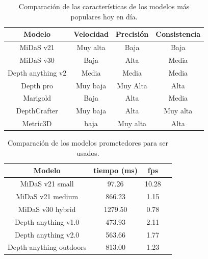 \begin{table}[h]
    \centering
    \begin{tabular}{|c|c|c|c|}
        \hline
        \textbf{Modelo} & \textbf{Velocidad}    & \textbf{Precisión}    & \textbf{Consistencia}   \\
        \hline
        MiDaS v21           & Muy alta          & Baja                  & Baja                      \\
        MiDaS v30           & Baja              & Alta                  & Media                     \\
        Depth anything v2   & Media             & Media                 & Media                     \\
        Depth pro           & Muy baja          & Muy Alta              & Alta                      \\
        Marigold            & Baja              & Alta                  & Media                      \\
        DepthCrafter        & Muy baja          & Alta                  & Muy alta                  \\
        Metric3D            & baja              & Muy alta              & Alta                      \\
        \hline
    \end{tabular}
    \caption{Comparación de las características de los modelos más populares hoy en día.}
    \label{tab:mercado_estudio}
\end{table}


\begin{table}[h]
    \centering
    \begin{tabular}{|c|c|c|c|}
        \hline
        \textbf{Modelo} & \textbf{tiempo (ms)}    & \textbf{fps}    \\
        \hline
        MiDaS v21 small             & 97.26             & 10.28              \\
        MiDaS v21 medium            & 866.23          & 1.15              \\
        MiDaS v30 hybrid            & 1279.50            & 0.78             \\
        Depth anything v1.0         & 473.93           & 2.11               \\
        Depth anything v2.0         & 563.66            & 1.77              \\
        Depth anything outdoors     & 813.00          & 1.23              \\
        \hline
    \end{tabular}
    \caption{Comparación de los modelos prometedores para ser usados.}
    \label{tab:estudio_fps}
\end{table}


